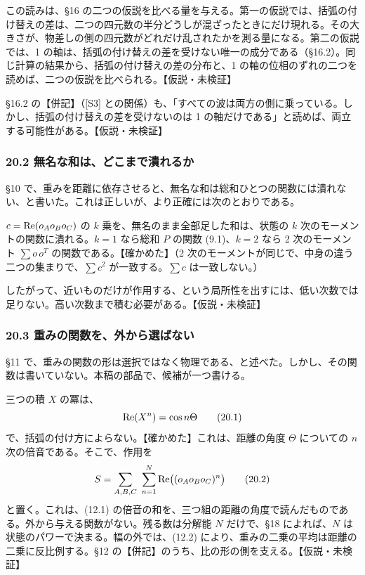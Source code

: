 \documentclass[
  a4paper,
]{ltjsarticle}
\begin{document}
この読みは、§16
の二つの仮説を比べる量を与える。第一の仮説では、括弧の付け替えの差は、二つの四元数の半分どうしが混ざったときにだけ現れる。その大きさが、物差しの側の四元数がどれだけ乱されたかを測る量になる。第二の仮説では、1
の軸は、括弧の付け替えの差を受けない唯一の成分である（§16.2）。同じ計算の結果から、括弧の付け替えの差の分布と、1
の軸の位相のずれの二つを読めば、二つの仮説を比べられる。【仮説・未検証】

§16.2 の【併記】（{[}S3{]}
との関係）も、「すべての波は両方の側に乗っている。しかし、括弧の付け替えの差を受けないのは
1 の軸だけである」と読めば、両立する可能性がある。【仮説・未検証】

\subsubsection{20.2
無名な和は、どこまで潰れるか}\label{ux7121ux540dux306aux548cux306fux3069ux3053ux307eux3067ux6f70ux308cux308bux304b}

§10
で、重みを距離に依存させると、無名な和は総和ひとつの関数には潰れない、と書いた。これは正しいが、より正確には次のとおりである。

\(c = {\rm Re}(o_Ao_Bo_C)\) の \(k\)
乗を、無名のまま全部足した和は、状態の \(k\)
次のモーメントの関数に潰れる。\(k = 1\) なら総和 \(P\) の関数
(9.1)、\(k = 2\) なら 2 次のモーメント \(\sum o\,o^T\)
の関数である。【確かめた】（2
次のモーメントが同じで、中身の違う二つの集まりで、\(\sum c^2\)
が一致する。\(\sum c\) は一致しない。）

したがって、近いものだけが作用する、という局所性を出すには、低い次数では足りない。高い次数まで積む必要がある。【仮説・未検証】

\subsubsection{20.3
重みの関数を、外から選ばない}\label{ux91cdux307fux306eux95a2ux6570ux3092ux5916ux304bux3089ux9078ux3070ux306aux3044}

§11
で、重みの関数の形は選択ではなく物理である、と述べた。しかし、その関数は書いていない。本稿の部品で、候補が一つ書ける。

三つの積 \(X\) の冪は、 \[
{\rm Re}(X^n) = \cos n\Theta \tag{20.1}
\] で、括弧の付け方によらない。【確かめた】これは、距離の角度 \(\Theta\)
についての \(n\) 次の倍音である。そこで、作用を \[
S = \sum_{A,B,C}\ \sum_{n=1}^{N}{\rm Re}\big((o_Ao_Bo_C)^n\big) \tag{20.2}
\] と置く。これは、(12.1)
の倍音の和を、三つ組の距離の角度で読んだものである。外から与える関数がない。残る数は分解能
\(N\) だけで、§18 によれば、\(N\)
は状態のパワーで決まる。幅の外では、(12.2)
により、重みの二乗の平均は距離の二乗に反比例する。§12
の【併記】のうち、比の形の側を支える。【仮説・未検証】
\end{document}
